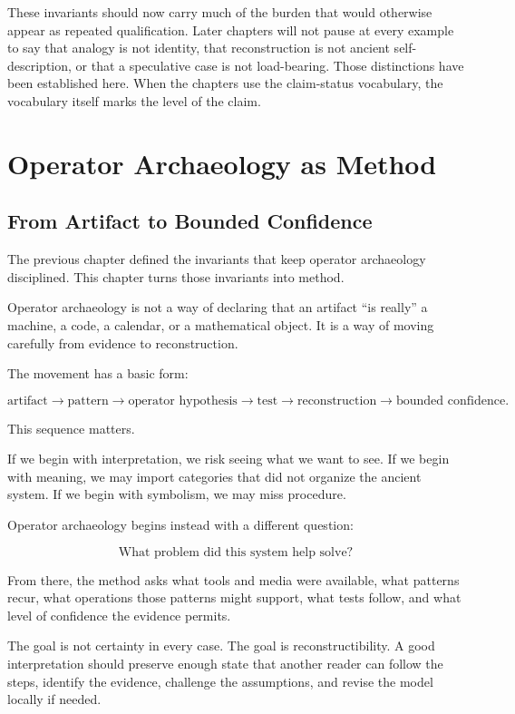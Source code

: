 \documentclass[11pt]{book}
\begin{document}
These invariants should now carry much of the burden that would otherwise appear as repeated qualification. Later chapters will not pause at every example to say that analogy is not identity, that reconstruction is not ancient self-description, or that a speculative case is not load-bearing. Those distinctions have been established here. When the chapters use the claim-status vocabulary, the vocabulary itself marks the level of the claim.

\chapter{Operator Archaeology as Method}

\section{From Artifact to Bounded Confidence}

The previous chapter defined the invariants that keep operator archaeology disciplined. This chapter turns those invariants into method.

Operator archaeology is not a way of declaring that an artifact ``is really'' a machine, a code, a calendar, or a mathematical object. It is a way of moving carefully from evidence to reconstruction.

The movement has a basic form:

\[
\text{artifact}
\rightarrow
\text{pattern}
\rightarrow
\text{operator hypothesis}
\rightarrow
\text{test}
\rightarrow
\text{reconstruction}
\rightarrow
\text{bounded confidence}.
\]

This sequence matters.

If we begin with interpretation, we risk seeing what we want to see. If we begin with meaning, we may import categories that did not organize the ancient system. If we begin with symbolism, we may miss procedure.

Operator archaeology begins instead with a different question:

\[
\text{What problem did this system help solve?}
\]

From there, the method asks what tools and media were available, what patterns recur, what operations those patterns might support, what tests follow, and what level of confidence the evidence permits.

The goal is not certainty in every case. The goal is reconstructibility. A good interpretation should preserve enough state that another reader can follow the steps, identify the evidence, challenge the assumptions, and revise the model locally if needed.
\end{document}
